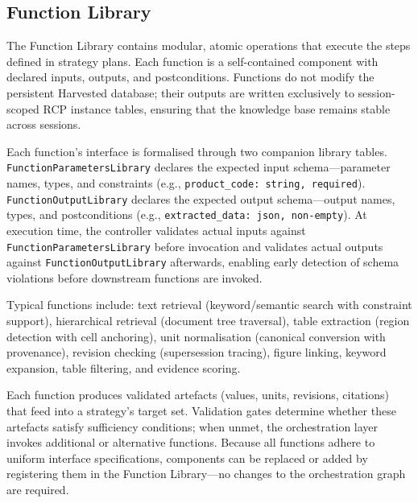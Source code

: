 \documentclass[largeformat]{interact}
\begin{document}
\subsection{Function Library}
\label{subsec:function_library}
The Function Library contains modular, atomic operations that execute the steps defined in strategy plans. Each function is a self-contained component with declared inputs, outputs, and postconditions. Functions do not modify the persistent Harvested database; their outputs are written exclusively to session-scoped RCP instance tables, ensuring that the knowledge base remains stable across sessions.
 
Each function's interface is formalised through two companion library tables. \texttt{FunctionParametersLibrary} declares the expected input schema---parameter names, types, and constraints (e.g., \texttt{product\_code: string, required}). \texttt{FunctionOutputLibrary} declares the expected output schema---output names, types, and postconditions (e.g., \texttt{extracted\_data: json, non-empty}). At execution time, the controller validates actual inputs against \texttt{FunctionParametersLibrary} before invocation and validates actual outputs against \texttt{FunctionOutputLibrary} afterwards, enabling early detection of schema violations before downstream functions are invoked.
 
Typical functions include: text retrieval (keyword/semantic search with constraint support), hierarchical retrieval (document tree traversal), table extraction (region detection with cell anchoring), unit normalisation (canonical conversion with provenance), revision checking (supersession tracing), figure linking, keyword expansion, table filtering, and evidence scoring.
 
Each function produces validated artefacts (values, units, revisions, citations) that feed into a strategy's target set. Validation gates determine whether these artefacts satisfy sufficiency conditions; when unmet, the orchestration layer invokes additional or alternative functions. Because all functions adhere to uniform interface specifications, components can be replaced or added by registering them in the Function Library---no changes to the orchestration graph are required.



\end{document}
